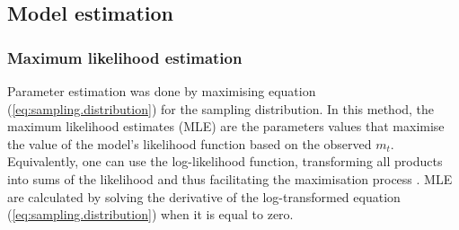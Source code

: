 
\subsection{Model estimation}

\subsubsection{Maximum likelihood estimation}

Parameter estimation was done by maximising equation (\ref{eq:sampling.distribution}) for the sampling distribution.
In this method, the maximum likelihood estimates (MLE) are the parameters values that maximise the value of the model's likelihood function based on the observed $m_t$.
Equivalently, one can use the log-likelihood function,
%
%
transforming all products into sums of the likelihood and thus facilitating the maximisation process \cite{williams1994maximum}.
MLE are calculated by solving the derivative of the log-transformed equation (\ref{eq:sampling.distribution}) when it is equal to zero.
